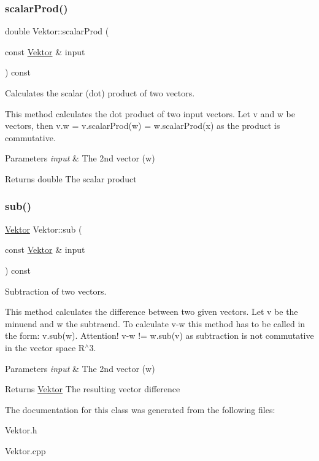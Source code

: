 \subsubsection{\texorpdfstring{scalar\+Prod()}{scalarProd()}}
{\footnotesize\ttfamily double Vektor\+::scalar\+Prod (\begin{DoxyParamCaption}\item[{const \hyperlink{class_vektor}{Vektor} \&}]{input }\end{DoxyParamCaption}) const}



Calculates the scalar (dot) product of two vectors. 

This method calculates the dot product of two input vectors. Let v and w be vectors, then v.\+w = v.\+scalar\+Prod(w) = w.\+scalar\+Prod(x) as the product is commutative.


\begin{DoxyParams}{Parameters}
{\em input} & The 2nd vector (w) \\
\hline
\end{DoxyParams}
\begin{DoxyReturn}{Returns}
double The scalar product 
\end{DoxyReturn}
\mbox{\label{class_vektor_a9e095d5d627ad26c7c2d6f227567e731}} 
\subsubsection{\texorpdfstring{sub()}{sub()}}
{\footnotesize\ttfamily \hyperlink{class_vektor}{Vektor} Vektor\+::sub (\begin{DoxyParamCaption}\item[{const \hyperlink{class_vektor}{Vektor} \&}]{input }\end{DoxyParamCaption}) const}



Subtraction of two vectors. 

This method calculates the difference between two given vectors. Let v be the minuend and w the subtraend. To calculate v-\/w this method has to be called in the form\+: v.\+sub(w). Attention! v-\/w != w.\+sub(v) as subtraction is not commutative in the vector space R$^\wedge$3.


\begin{DoxyParams}{Parameters}
{\em input} & The 2nd vector (w) \\
\hline
\end{DoxyParams}
\begin{DoxyReturn}{Returns}
\hyperlink{class_vektor}{Vektor} The resulting vector difference 
\end{DoxyReturn}


The documentation for this class was generated from the following files\+:\begin{DoxyCompactItemize}
\item 
Vektor.\+h\item 
Vektor.\+cpp\end{DoxyCompactItemize}
